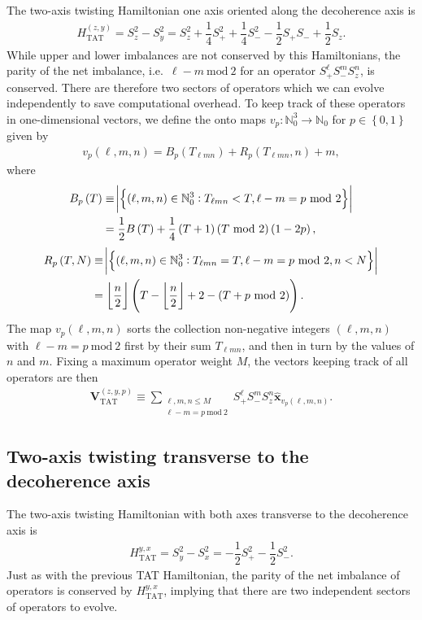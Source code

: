 \documentclass[aps,notitlepage,nofootinbib,11pt]{revtex4-1}
\renewcommand{\t}{\text} %
\newcommand{\f}[2]{\dfrac{#1}{#2}} %
\newcommand{\p}[1]{\left(#1\right)} %
\renewcommand{\set}[1]{\left\{#1\right\}} %
\renewcommand{\v}{\bm} %
\newcommand{\uv}[1]{\v{\hat{#1}}} %
\newcommand{\N}{\mathbb{N}}
\newcommand{\floor}[1]{\left\lfloor{#1}\right\rfloor}
\newcommand{\1}{\mathds{1}}
\begin{document}
The two-axis twisting Hamiltonian one axis oriented along the
decoherence axis is
\begin{align}
  H_{\t{TAT}}^{\p{z,y}}
  = S_z^2 - S_y^2
  = S_z^2 + \f14 S_+^2 + \f14 S_-^2 - \f12 S_+ S_- + \f12 S_z.
\end{align}
While upper and lower imbalances are not conserved by this
Hamiltonians, the parity of the net imbalance, i.e.~$\ell-m~\t{mod}~2$
for an operator $S_+^\ell S_-^m S_z^n$, is conserved.  There are
therefore two sectors of operators which we can evolve independently
to save computational overhead.  To keep track of these operators in
one-dimensional vectors, we define the onto maps $v_p:\N_0^3\to\N_0$
for $p\in\set{0,1}$ given by
\begin{align}
  v_p\p{\ell,m,n} = B_p\p{T_{\ell mn}} + R_p\p{T_{\ell mn},n} + m,
\end{align}
where
\begin{align}
  B_p\p{T}
  &\equiv \abs{\set{\p{\ell,m,n}\in\N_0^3 :
      T_{\ell mn}<T, \ell-m=p~\t{mod}~2}} \\
  &= \f12 B\p{T} + \f14 \p{T+1} \p{T~\t{mod}~2} \p{1-2p},
\end{align}
\begin{align}
  R_p\p{T,N}
  &\equiv \abs{\set{\p{\ell,m,n}\in\N_0^3 :
      T_{\ell mn}=T, \ell-m=p~\t{mod}~2, n < N }} \\
  &= \floor{\f{n}{2}}
  \p{T - \floor{\f{n}{2}} + 2 - \p{T+p~\t{mod}~2}}.
\end{align}
The map $v_p\p{\ell,m,n}$ sorts the collection non-negative integers
$\p{\ell,m,n}$ with $\ell-m=p~\t{mod}~2$ first by their sum
$T_{\ell mn}$, and then in turn by the values of $n$ and $m$.  Fixing
a maximum operator weight $M$, the vectors keeping track of all
operators are then
\begin{align}
  \v V_{\t{TAT}}^{\p{z,y,p}}
  \equiv \sum_{\substack{\ell,m,n\le M\\\ell-m=p~\t{mod}~2}}
  S_+^\ell S_-^m S_z^n \uv x_{v_p\p{\ell,m,n}}.
\end{align}


\subsection{Two-axis twisting transverse to the decoherence axis}


The two-axis twisting Hamiltonian with both axes transverse to the
decoherence axis is
\begin{align}
  H_{\t{TAT}}^{y,x}
  = S_y^2 - S_x^2
  = - \f12 S_+^2 - \f12 S_-^2.
\end{align}
Just as with the previous TAT Hamiltonian, the parity of the net
imbalance of operators is conserved by $H_{\t{TAT}}^{y,x}$, implying
that there are two independent sectors of operators to evolve.
\end{document}
